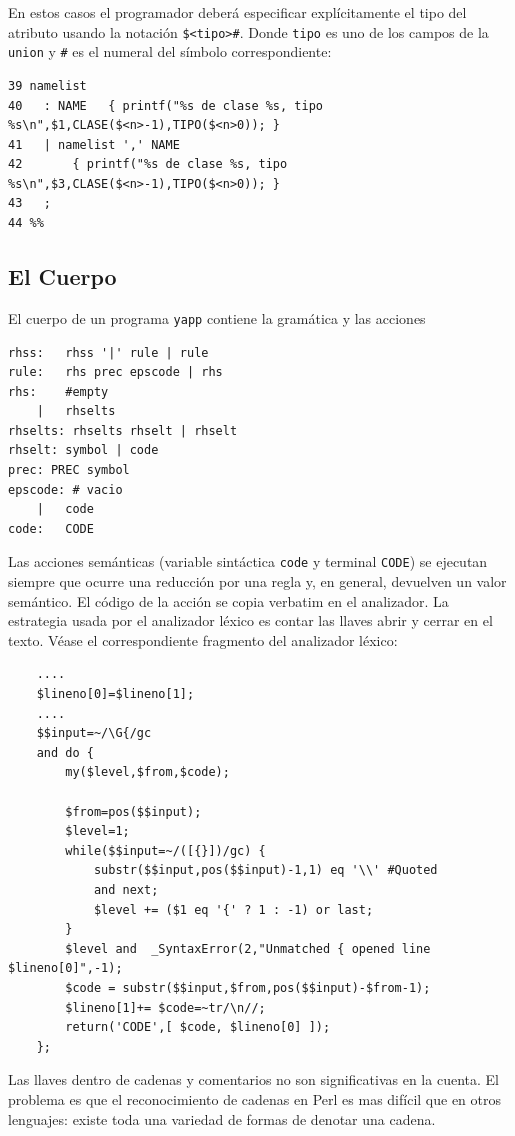 En estos casos 
el programador deberá especificar explícitamente el tipo del 
atributo usando la notación \verb|$<tipo>#|. Donde \verb|tipo| es 
uno de los campos de la \verb|union| y \verb|#| es el numeral 
del símbolo correspondiente:

\begin{verbatim}
39 namelist
40   : NAME   { printf("%s de clase %s, tipo %s\n",$1,CLASE($<n>-1),TIPO($<n>0)); }
41   | namelist ',' NAME 
42       { printf("%s de clase %s, tipo %s\n",$3,CLASE($<n>-1),TIPO($<n>0)); }
43   ;
44 %%
\end{verbatim}

\subsection{El Cuerpo}
\label{subsection:elcuerpo}
El cuerpo de un programa \verb|yapp| contiene la gramática
y las acciones 
\begin{verbatim}
rhss:   rhss '|' rule | rule 
rule:   rhs prec epscode | rhs 
rhs:    #empty     
    |   rhselts   
rhselts: rhselts rhselt | rhselt  
rhselt: symbol | code 
prec: PREC symbol
epscode: # vacio 
    |   code  
code:   CODE 
\end{verbatim}
Las acciones semánticas (variable sintáctica \verb|code| y terminal \verb|CODE|)
se ejecutan siempre que ocurre una reducción por una regla y, en general, devuelven 
un valor semántico. El código de la acción se copia verbatim
en el analizador. La estrategia usada por el analizador léxico
es contar las llaves abrir y cerrar en 
el texto. Véase el correspondiente fragmento del analizador
léxico:
\begin{verbatim}
    ....
    $lineno[0]=$lineno[1];
    ....
    $$input=~/\G{/gc
    and do {
        my($level,$from,$code);

        $from=pos($$input);
        $level=1;
        while($$input=~/([{}])/gc) {
            substr($$input,pos($$input)-1,1) eq '\\' #Quoted 
            and next;
            $level += ($1 eq '{' ? 1 : -1) or last;
        }
        $level and  _SyntaxError(2,"Unmatched { opened line $lineno[0]",-1);
        $code = substr($$input,$from,pos($$input)-$from-1);
        $lineno[1]+= $code=~tr/\n//;
        return('CODE',[ $code, $lineno[0] ]);
    };
\end{verbatim}
Las llaves dentro de cadenas y comentarios no son significativas en la cuenta.
El problema es que el reconocimiento de cadenas en Perl es mas difícil que
en otros lenguajes: existe toda una variedad de formas de denotar una cadena.
